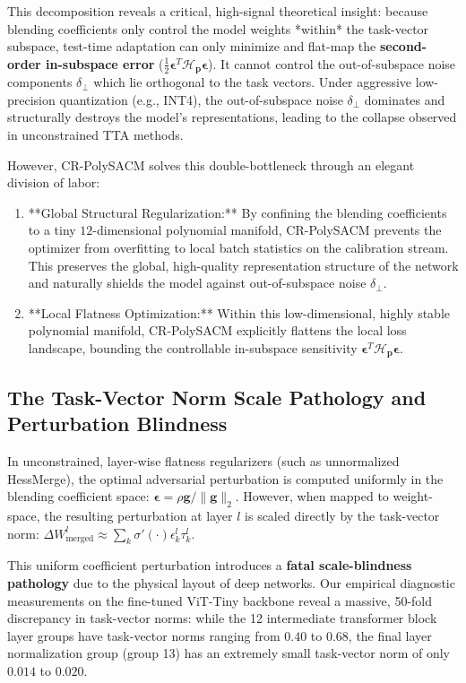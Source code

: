 This decomposition reveals a critical, high-signal theoretical insight: because blending coefficients only control the model weights *within* the task-vector subspace, test-time adaptation can only minimize and flat-map the \textbf{second-order in-subspace error} ($\frac{1}{2} \boldsymbol{\epsilon}^T \mathcal{H}_{\mathbf{p}} \boldsymbol{\epsilon}$). It cannot control the out-of-subspace noise components $\delta_{\perp}$ which lie orthogonal to the task vectors. Under aggressive low-precision quantization (e.g., INT4), the out-of-subspace noise $\delta_{\perp}$ dominates and structurally destroys the model's representations, leading to the collapse observed in unconstrained TTA methods.

However, CR-PolySACM solves this double-bottleneck through an elegant division of labor:
\begin{enumerate}
    \item **Global Structural Regularization:** By confining the blending coefficients to a tiny $12$-dimensional polynomial manifold, CR-PolySACM prevents the optimizer from overfitting to local batch statistics on the calibration stream. This preserves the global, high-quality representation structure of the network and naturally shields the model against out-of-subspace noise $\delta_{\perp}$.
    \item **Local Flatness Optimization:** Within this low-dimensional, highly stable polynomial manifold, CR-PolySACM explicitly flattens the local loss landscape, bounding the controllable in-subspace sensitivity $\boldsymbol{\epsilon}^T \mathcal{H}_{\mathbf{p}} \boldsymbol{\epsilon}$.
\end{enumerate}

\subsection{The Task-Vector Norm Scale Pathology and Perturbation Blindness}
In unconstrained, layer-wise flatness regularizers (such as unnormalized HessMerge), the optimal adversarial perturbation is computed uniformly in the blending coefficient space: $\boldsymbol{\epsilon} = \rho \mathbf{g} / \|\mathbf{g}\|_2$. However, when mapped to weight-space, the resulting perturbation at layer $l$ is scaled directly by the task-vector norm: $\Delta W_{\text{merged}}^l \approx \sum_k \sigma'(\cdot) \epsilon_k^l \tau_k^l$.

This uniform coefficient perturbation introduces a \textbf{fatal scale-blindness pathology} due to the physical layout of deep networks. Our empirical diagnostic measurements on the fine-tuned ViT-Tiny backbone reveal a massive, 50-fold discrepancy in task-vector norms: while the 12 intermediate transformer block layer groups have task-vector norms ranging from $0.40$ to $0.68$, the final layer normalization group (group 13) has an extremely small task-vector norm of only $0.014$ to $0.020$. 

